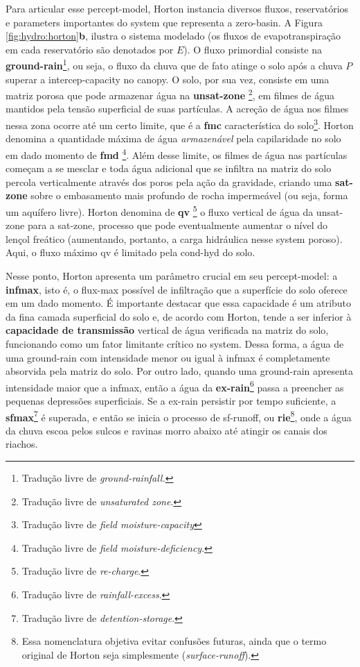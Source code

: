 \documentclass[./main.tex]{subfiles}
\begin{document}
\par Para articular esse \gls{percept-model}, Horton instancia diversos fluxos, reservatórios e \gls{parameters} importantes do \gls{system} que representa a \gls{zero-basin}. A Figura \ref{fig:hydro:horton}\textbf{b}, ilustra o sistema modelado (os fluxos de evapotranspiração em cada reservatório são denotados por $E$). O fluxo primordial consiste na \textbf{\gls{ground-rain}}\footnote{Tradução livre de \textit{ground-rainfall.}}, ou seja, o fluxo da chuva que de fato atinge o solo após a chuva $P$ superar a \gls{intercep-capacity} no \gls{canopy}. O solo, por sua vez, consiste em uma matriz porosa que pode armazenar água na \textbf{\gls{unsat-zone}} \footnote{Tradução livre de \textit{unsaturated zone}.}, em filmes de água mantidos pela tensão superficial de suas partículas. A acreção de água nos filmes nessa zona ocorre até um certo limite, que é a \textbf{\gls{fmc}} característica do solo\footnote{Tradução livre de \textit{field moisture-capacity}}. Horton denomina a quantidade máxima de água \textit{armazenável} pela capilaridade no solo em dado momento de \textbf{\gls{fmd}} \footnote{Tradução livre de \textit{field moisture-deficiency}.}. Além desse limite, os filmes de água nas partículas começam a se mesclar e toda água adicional que se infiltra na matriz do solo percola verticalmente através dos poros pela ação da gravidade, criando uma \textbf{\gls{sat-zone}} sobre o embasamento mais profundo de rocha impermeável (ou seja, forma um aquífero livre). Horton denomina de \textbf{\gls{qv}} \footnote{Tradução livre de \textit{re-charge}.} o fluxo vertical de água da \gls{unsat-zone} para a \gls{sat-zone}, processo que pode eventualmente aumentar o nível do lençol freático (aumentando, portanto, a carga hidráulica nesse \gls{system} poroso). Aqui, o fluxo máximo \gls{qv} é limitado pela \gls{cond-hyd} do solo.

\par Nesse ponto, Horton apresenta um parâmetro crucial em seu \gls{percept-model}: a \textbf{\gls{infmax}}, isto é, o \gls{flux-max} possível de infiltração que a superfície do solo oferece em um dado momento. É importante destacar que essa capacidade é um atributo da fina camada superficial do solo e, de acordo com Horton, tende a ser inferior à \textbf{capacidade de transmissão} vertical de água verificada na matriz do solo, funcionando como um fator limitante crítico no \gls{system}. Dessa forma, a água de uma \gls{ground-rain} com intensidade menor ou igual à \gls{infmax} é completamente absorvida pela matriz do solo. Por outro lado, quando uma \gls{ground-rain} apresenta intensidade maior que a \gls{infmax}, então a água da \textbf{\gls{ex-rain}}\footnote{Tradução livre de \textit{rainfall-excess}.} passa a preencher as pequenas depressões superficiais. Se a \gls{ex-rain} persistir por tempo suficiente, a \textbf{\gls{sfmax}}\footnote{Tradução livre de \textit{detention-storage}.} é superada, e então se inicia o processo de \gls{sf-runoff}, ou \textbf{\gls{rie}}\footnote{Essa nomenclatura objetiva evitar confusões futuras, ainda que o termo original de Horton seja simplesmente  (\textit{surface-runoff}).}, onde a água da chuva escoa pelos sulcos e ravinas morro abaixo até atingir os canais dos riachos. 
\end{document}
